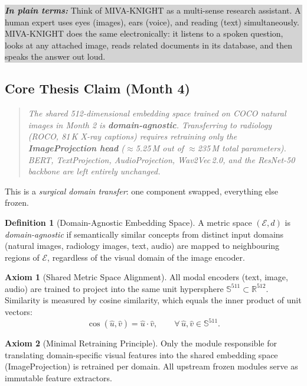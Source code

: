 \documentclass[12pt, a4paper]{article}
\theoremstyle{definition}
\newtheorem{definition}{Definition}[section]
\newtheorem{axiom}{Axiom}[section]
\theoremstyle{plain}
\theoremstyle{remark}
\newcommand{\R}{\mathbb{R}}
\newcommand{\Sphere}{\mathbb{S}}
\newcommand{\Emb}{\mathcal{E}}
\newcommand{\layman}[1]{%
  \vspace{4pt}%
  \noindent\colorbox{lightgray}{\parbox{\dimexpr\linewidth-2\fboxsep}{%
    \textbf{\textit{In plain terms:}} #1}}%
  \vspace{4pt}%
}
\begin{document}
\layman{Think of MIVA-KNIGHT as a multi-sense research assistant. A human expert uses eyes (images), ears (voice), and reading (text) simultaneously. MIVA-KNIGHT does the same electronically: it listens to a spoken question, looks at any attached image, reads related documents in its database, and then speaks the answer out loud.}

\subsection{Core Thesis Claim (Month 4)}

\begin{quote}
\itshape
The shared 512-dimensional embedding space trained on COCO natural images in Month 2 is \textbf{domain-agnostic}. Transferring to radiology (ROCO, 81\,K X-ray captions) requires retraining only the \textbf{ImageProjection head} ($\approx$5.25\,M out of $\approx$235\,M total parameters). BERT, TextProjection, AudioProjection, Wav2Vec\,2.0, and the ResNet-50 backbone are left entirely unchanged.
\end{quote}

This is a \emph{surgical domain transfer}: one component swapped, everything else frozen.

\begin{definition}[Domain-Agnostic Embedding Space]
A metric space $(\Emb, d)$ is \emph{domain-agnostic} if semantically similar concepts from distinct input domains (natural images, radiology images, text, audio) are mapped to neighbouring regions of $\Emb$, regardless of the visual domain of the image encoder.
\end{definition}

\begin{axiom}[Shared Metric Space Alignment]
All modal encoders (text, image, audio) are trained to project into the same unit hypersphere $\Sphere^{511} \subset \R^{512}$. Similarity is measured by cosine similarity, which equals the inner product of unit vectors:
\[
\cos(\hat{u}, \hat{v}) = \hat{u} \cdot \hat{v}, \qquad \forall\, \hat{u}, \hat{v} \in \Sphere^{511}.
\]
\end{axiom}

\begin{axiom}[Minimal Retraining Principle]
Only the module responsible for translating domain-specific visual features into the shared embedding space (ImageProjection) is retrained per domain. All upstream frozen modules serve as immutable feature extractors.
\end{axiom}
\end{document}
